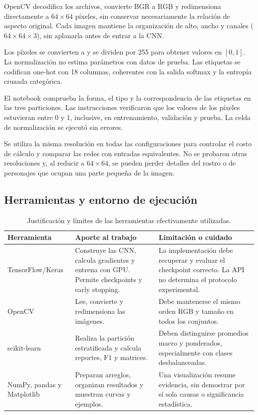 \documentclass[11pt,letterpaper]{article}
\newcommand{\nombre}[1]{\texttt{\detokenize{#1}}}
\begin{document}
OpenCV decodifica los archivos, convierte BGR a RGB y redimensiona directamente a $64\times64$ píxeles, sin conservar necesariamente la relación de aspecto original. Cada imagen mantiene la organización de alto, ancho y canales ($64\times64\times3$), sin aplanarla antes de entrar a la CNN.

Los píxeles se convierten a \nombre{float32} y se dividen por 255 para obtener valores en $[0,1]$. La normalización no estima parámetros con datos de prueba. Las etiquetas se codifican one-hot con 18 columnas, coherentes con la salida softmax y la entropía cruzada categórica.

El notebook comprueba la forma, el tipo y la correspondencia de las etiquetas en las tres particiones. Las instrucciones \nombre{assert} verificaron que los valores de los píxeles estuvieran entre 0 y 1, inclusive, en entrenamiento, validación y prueba. La celda de normalización se ejecutó sin errores.

Se utiliza la misma resolución en todas las configuraciones para controlar el costo de cálculo y comparar las redes con entradas equivalentes. No se probaron otras resoluciones y, al reducir a $64\times64$, se pueden perder detalles del rostro o de personajes que ocupan una parte pequeña de la imagen.

\subsection{Herramientas y entorno de ejecución}
\begin{table}[H]
\centering\small
\begin{tabularx}{\linewidth}{lYY}
\toprule
Herramienta & Aporte al trabajo & Limitación o cuidado \\
\midrule
TensorFlow/Keras & Construye las CNN, calcula gradientes y entrena con GPU. Permite checkpoints y early stopping. & La implementación debe recuperar y evaluar el checkpoint correcto. La API no determina el protocolo experimental. \\
OpenCV & Lee, convierte y redimensiona las imágenes. & Debe mantenerse el mismo orden RGB y tamaño en todos los conjuntos. \\
scikit-learn & Realiza la partición estratificada y calcula reportes, F1 y matrices. & Deben distinguirse promedios macro y ponderados, especialmente con clases desbalanceadas. \\
NumPy, pandas y Matplotlib & Preparan arreglos, organizan resultados y muestran curvas y ejemplos. & Una visualización resume evidencia, sin demostrar por sí sola causas o significancia estadística. \\
\bottomrule
\end{tabularx}
\caption{Justificación y límites de las herramientas efectivamente utilizadas.}
\label{tab:herramientas}
\end{table}
\end{document}
